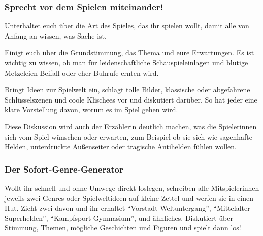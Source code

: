 \begin{multicols}{3}
\subsubsection*{Sprecht vor dem Spielen
miteinander!}\label{sprecht-vor-dem-spielen-miteinander}

Unterhaltet euch über die Art des Spieles, das ihr spielen wollt, damit
alle von Anfang an wissen, was Sache ist.

Einigt euch über die Grundstimmung, das Thema und eure Erwartungen. Es
ist wichtig zu wissen, ob man für leidenschaftliche Schauspieleinlagen
und blutige Metzeleien Beifall oder eher Buhrufe ernten wird.

Bringt Ideen zur Spielwelt ein, schlagt tolle Bilder, klassische oder
abgefahrene Schlüsselszenen und coole Klischees vor und diskutiert
darüber. So hat jeder eine klare Vorstellung davon, worum es im Spiel
gehen wird.

Diese Diskussion wird auch der Erzählerin deutlich machen, was die
Spielerinnen sich vom Spiel wünschen oder erwarten, zum Beispiel ob sie
sich wie sagenhafte Helden, unterdrückte Außenseiter oder tragische
Antihelden fühlen wollen.

\subsubsection*{Der
Sofort-Genre-Generator}\label{der-sofort-genre-generator}

Wollt ihr schnell und ohne Umwege direkt loslegen, schreiben alle
Mitspielerinnen jeweils zwei Genres oder Spielweltideen auf kleine
Zettel und werfen sie in einen Hut. Zieht zwei davon und ihr erhaltet
``Vorstadt-Weltuntergang'', ``Mittelalter-Superhelden'',
``Kampfsport-Gymnasium'', und ähnliches. Diskutiert über Stimmung,
Themen, mögliche Geschichten und Figuren und spielt dann los!

\end{multicols}


